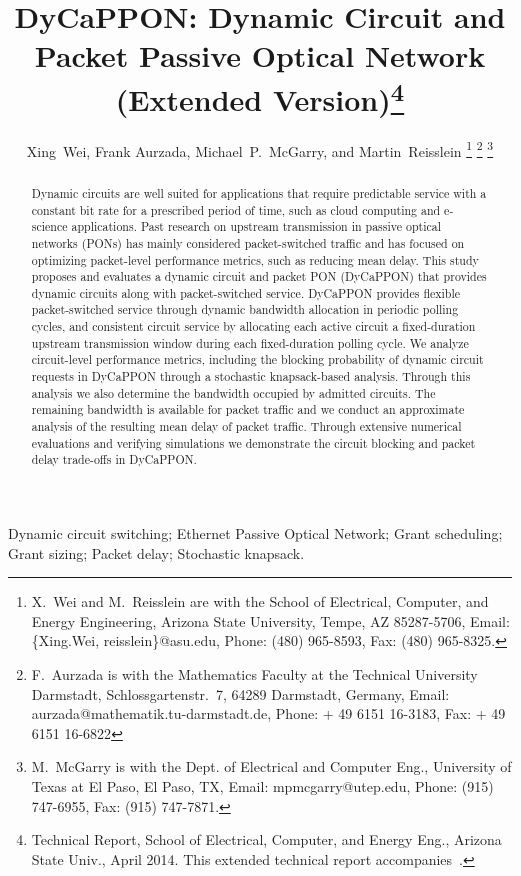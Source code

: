 \documentclass[article]{IEEEtran}
\title{DyCaPPON: Dynamic Circuit and Packet Passive Optical
   Network (Extended Version)\thanks{Technical Report, School of
Electrical, Computer, and Energy Eng., Arizona State Univ., April 2014.
This extended technical report accompanies~\cite{WeAMR14}.}}
\author{Xing~Wei, Frank Aurzada, Michael~P.~McGarry, and Martin~Reisslein
\thanks{X.~Wei and M.~Reisslein are with
the School of Electrical, Computer, and Energy Engineering,
Arizona State University, Tempe, AZ 85287-5706,
Email: \{Xing.Wei, reisslein\}@asu.edu,
Phone: (480) 965-8593, Fax: (480) 965-8325.}
\thanks{F.~Aurzada is with the Mathematics Faculty at the
Technical University Darmstadt, Schlossgartenstr.~7,
64289 Darmstadt, Germany, Email: aurzada@mathematik.tu-darmstadt.de,
Phone: + 49 6151 16-3183, Fax: + 49 6151 16-6822}
\thanks{M.\ McGarry is with
the Dept. of Electrical and Computer Eng., University of Texas at El Paso,
El Paso, TX, Email: mpmcgarry@utep.edu,
Phone: (915) 747-6955, Fax: (915) 747-7871.}
 }
\begin{document}
\maketitle

\begin{abstract}
Dynamic circuits are well suited for applications that require
predictable service with a
constant bit rate for a prescribed period of time, such as
cloud computing and e-science applications.
Past research on upstream transmission in
passive optical networks (PONs) has mainly
considered packet-switched traffic and has focused on optimizing
packet-level performance metrics, such as reducing mean delay.
This study proposes and evaluates a dynamic circuit and packet
PON (DyCaPPON) that provides dynamic circuits along with packet-switched
service.
DyCaPPON provides  flexible packet-switched service through
dynamic bandwidth allocation in periodic polling cycles,
and  consistent circuit service by allocating each active
circuit a fixed-duration upstream transmission window during
each fixed-duration polling cycle.
We analyze circuit-level performance metrics, including
the blocking probability of dynamic circuit requests
in DyCaPPON through
a stochastic knapsack-based analysis.
Through this analysis we also determine the bandwidth occupied
by admitted circuits. The remaining bandwidth is available for packet
traffic and we conduct an approximate analysis of
the resulting mean delay of packet traffic.
Through extensive numerical evaluations and verifying simulations
we demonstrate the circuit blocking and packet delay trade-offs in
DyCaPPON.
\end{abstract}

\begin{keywords}
Dynamic circuit switching; Ethernet Passive Optical Network;
Grant scheduling; Grant sizing; Packet delay; Stochastic knapsack.
\end{keywords}
\end{document}
